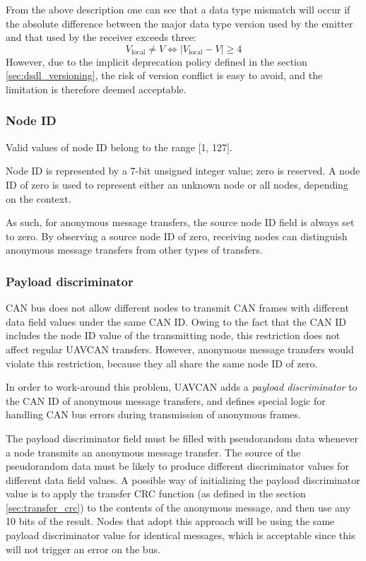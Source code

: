 From the above description one can see that a data type mismatch will occur if the absolute difference between
the major data type version used by the emitter and that used by the receiver exceeds three:
$$V_\text{local} \neq V \Leftrightarrow{} \vert{}V_\text{local} - V\vert{} \geq 4$$
However, due to the implicit deprecation policy defined in the section \ref{sec:dsdl_versioning},
the risk of version conflict is easy to avoid, and the limitation is therefore deemed acceptable.

\subsubsection{Node ID}

Valid values of node ID belong to the range [1, 127].

Node ID is represented by a 7-bit unsigned integer value; zero is reserved.
A node ID of zero is used to represent either an unknown node or all nodes, depending on the context.

As such, for anonymous message transfers, the source node ID field is always set to zero.
By observing a source node ID of zero, receiving nodes can distinguish
anonymous message transfers from other types of transfers.

\subsubsection{Payload discriminator}\label{sec:can_payload_discriminator}

CAN bus does not allow different nodes to transmit CAN frames with different data field values under the same CAN ID.
Owing to the fact that the CAN ID includes the node ID value of the transmitting node,
this restriction does not affect regular UAVCAN transfers.
However, anonymous message transfers would violate this restriction,
because they all share the same node ID of zero.

In order to work-around this problem,
UAVCAN adds a \emph{payload discriminator} to the CAN ID of anonymous message transfers,
and defines special logic for handling CAN bus errors during transmission of anonymous frames.

The payload discriminator field must be filled with pseudorandom data whenever a node transmits an
anonymous message transfer.
The source of the pseudorandom data must be likely to produce different discriminator values
for different data field values.
A possible way of initializing the payload discriminator value is to apply the transfer CRC function
(as defined in the section \ref{sec:transfer_crc})
to the contents of the anonymous message, and then use any 10 bits of the result.
Nodes that adopt this approach will be using the same payload discriminator value for identical messages,
which is acceptable since this will not trigger an error on the bus.


